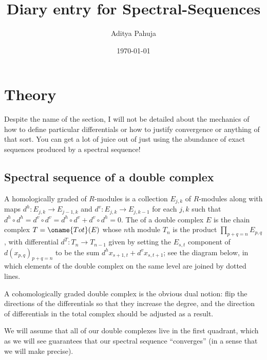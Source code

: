 \documentclass[10pt]{article}
\title{Diary entry for Spectral-Sequences}
\author{Aditya Pahuja}
\date{\today}
\begin{document}
\maketitle
\tableofcontents
\pagebreak

\section{Theory}
Despite the name of the section,
I will not be detailed about the mechanics of
how to define particular differentials
or how to justify convergence
or anything of that sort.
You can get a lot of juice out of just using
the abundance of exact sequences produced by a spectral sequence!

\subsection{Spectral sequence of a double complex}

\begin{definition}
    \label{def:double-complex}
    A homologically graded  of $R$-modules
    is a collection $E_{j,k}$ of $R$-modules
    along with maps $d^h\colon E_{j,k}\to E_{j-1,k}$
    and $d^v\colon E_{j,k}\to E_{j,k-1}$ for each $j,k$ such that
    $d^h\circ d^h = d^v\circ d^v = d^h\circ d^v + d^v\circ d^h = 0$.
    The  of a double complex $E$
    is the chain complex $T = \oname{Tot}(E)$ whose $n$th module $T_n$
    is the product $\prod_{p+q=n}E_{p,q}$,
    with differential $d^T\colon T_n\to T_{n-1}$ given by
    setting the $E_{s,t}$ component of $d(x_{p,q})_{p+q=n}$
    to be the sum $d^hx_{s+1,t} + d^v x_{s,t+1}$;
    see the diagram below, in which elements of the double complex
    on the same level are joined by dotted lines.
    \begin{center}
    \end{center}
    A cohomologically graded double complex is the
    obvious dual notion: flip the directions of the differentials
    so that they increase the degree, and the direction of differentials
    in the total complex should be adjusted as a result.
\end{definition}
We will assume that all of our double complexes live in the first quadrant,
which as we will see guarantees that our spectral sequence
``converges'' (in a sense that we will make precise).
\end{document}
